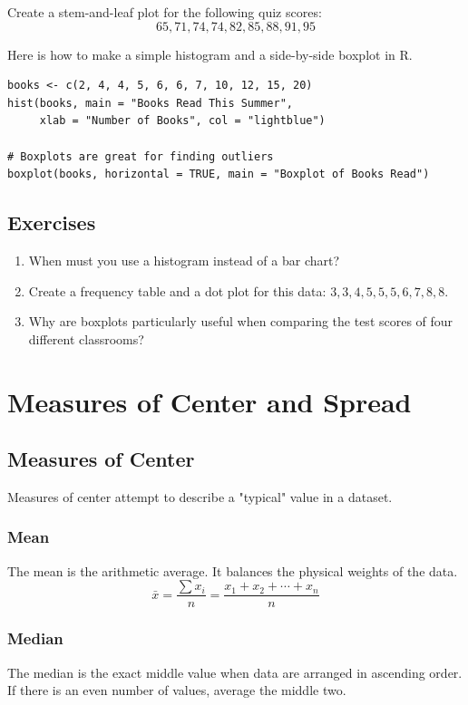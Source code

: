\documentclass[11pt,openany]{book}
\begin{document}
\begin{byhand}
Create a stem-and-leaf plot for the following quiz scores:
\[
65, 71, 74, 74, 82, 85, 88, 91, 95
\]
\end{byhand}

\begin{rstudio}
Here is how to make a simple histogram and a side-by-side boxplot in R.
\begin{lstlisting}[style=rcode]
books <- c(2, 4, 4, 5, 6, 6, 7, 10, 12, 15, 20)
hist(books, main = "Books Read This Summer",
     xlab = "Number of Books", col = "lightblue")

# Boxplots are great for finding outliers
boxplot(books, horizontal = TRUE, main = "Boxplot of Books Read")
\end{lstlisting}
\end{rstudio}

\section{Exercises}
\begin{enumerate}
    \item When must you use a histogram instead of a bar chart?
    \item Create a frequency table and a dot plot for this data: $3,3,4,5,5,5,6,7,8,8$.
    \item Why are boxplots particularly useful when comparing the test scores of four different classrooms?
\end{enumerate}

\chapter{Measures of Center and Spread}

\section{Measures of Center}
Measures of center attempt to describe a "typical" value in a dataset.

\subsection{Mean}
The mean is the arithmetic average. It balances the physical weights of the data.
\[
\bar{x} = \frac{\sum x_i}{n} = \frac{x_1 + x_2 + \cdots + x_n}{n}
\]

\subsection{Median}
The median is the exact middle value when data are arranged in ascending order. If there is an even number of values, average the middle two.
\end{document}
